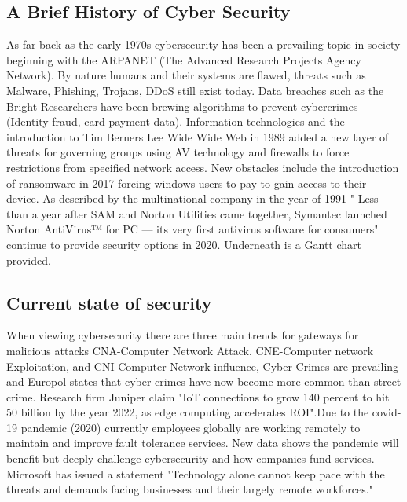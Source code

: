 \documentclass[journal]{IEEEtran}
\begin{document}
\subsection{A Brief History of Cyber Security}
As far back as the early 1970s cybersecurity has been a prevailing topic in society beginning with the ARPANET (The Advanced Research Projects Agency Network)\cite{Arpanet}. By nature humans and their systems are flawed, threats such as Malware, Phishing, Trojans,  DDoS still exist today. Data breaches such as the  Bright Researchers have been brewing algorithms to prevent cybercrimes (Identity fraud,  card payment data). Information technologies and the introduction to Tim Berners Lee Wide Wide Web in 1989 added a new layer of threats for governing groups using AV technology and firewalls to force restrictions from specified network access. New obstacles include the introduction of ransomware in 2017 forcing windows users to pay to gain access to their device. As described by the multinational company in the year of 1991  \cite{consumer}" Less than a year after SAM and Norton Utilities came together, Symantec launched Norton AntiVirus™ for PC — its very first antivirus software for consumers" continue to provide security options in 2020. Underneath is a Gantt chart provided.




\subsection{Current state of security} \label{subsec:Computing}

When viewing cybersecurity there are three main trends for gateways for malicious attacks CNA-Computer Network Attack, CNE-Computer network Exploitation, and CNI-Computer Network influence, Cyber Crimes are prevailing and \cite{crime} Europol states that cyber crimes have now become more common than street crime. Research firm Juniper claim \cite{iotStatistics} "IoT connections to grow  140 percent to hit 50 billion by the year  2022, as edge computing accelerates ROI".Due to the covid-19 pandemic (2020) currently employees globally are working remotely to maintain and improve fault tolerance services. New data shows the pandemic will benefit but deeply challenge cybersecurity and how companies fund services. Microsoft has issued a statement \cite{microsoft} "Technology alone cannot keep pace with the threats and demands facing businesses and their largely remote workforces." 
\end{document}
